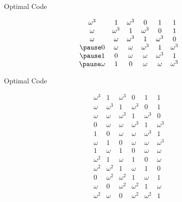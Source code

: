 \documentclass{beamer}
\begin{document}
 
 \begin{frame}{Optimal Code}
  
   \[
  \begin{array}{cccccc}
\omega^3&1&\omega^3&0&1&1\\
\omega&\omega^3&1&\omega^3&0&1\\
\omega&\omega&\omega^3&1&\omega^3&0\\ \pause
0&\omega&\omega&\omega^3&1&\omega^3\\ \pause
1&0&\omega&\omega&\omega^3&1\\ \pause 
\omega&1&0&\omega&\omega&\omega^3\\
  \end{array}
 \]
  
 \end{frame}
 
 
 \begin{frame}{Optimal Code}
 
  \[
  \begin{array}{cccccc}
\omega^3&1&\omega^3&0&1&1\\
\omega&\omega^3&1&\omega^3&0&1\\
\omega&\omega&\omega^3&1&\omega^3&0\\
0&\omega&\omega&\omega^3&1&\omega^3\\
1&0&\omega&\omega&\omega^3&1\\
\omega&1&0&\omega&\omega&\omega^3\\ \hline
1&\omega&1&0&\omega&\omega\\
\omega^2&1&\omega&1&0&\omega\\
\omega^2&\omega^2&1&\omega&1&0\\
0&\omega^2&\omega^2&1&\omega&1\\
\omega&0&\omega^2&\omega^2&1&\omega\\
\omega^2&\omega&0&\omega^2&\omega^2&1 
  \end{array}
  \]
  
 \end{frame}

 
\end{document}
